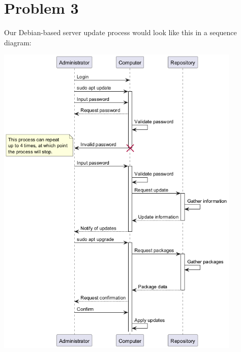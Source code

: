 \documentclass[12pt]{article}
\begin{document}
\clearpage
\section*{Problem 3}

Our Debian-based server update process would look like this in a sequence diagram:

\begin{center}
	\includegraphics[height=6in]{DebianServerUpdateDiagram}
\end{center}
\end{document}
